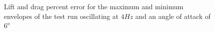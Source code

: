 \documentclass[11pt]{ucthesis}
\begin{document}
\begin{figure}[thpb]
\hfill
{}
\hfill
{}
\hfill
\caption{Lift and drag percent error for the maximum and minimum envelopes of the test run oscillating at $4 Hz$ and an angle of attack of $6^o$}
\label{fig:PError5454}
\end{figure}
\end{document}
